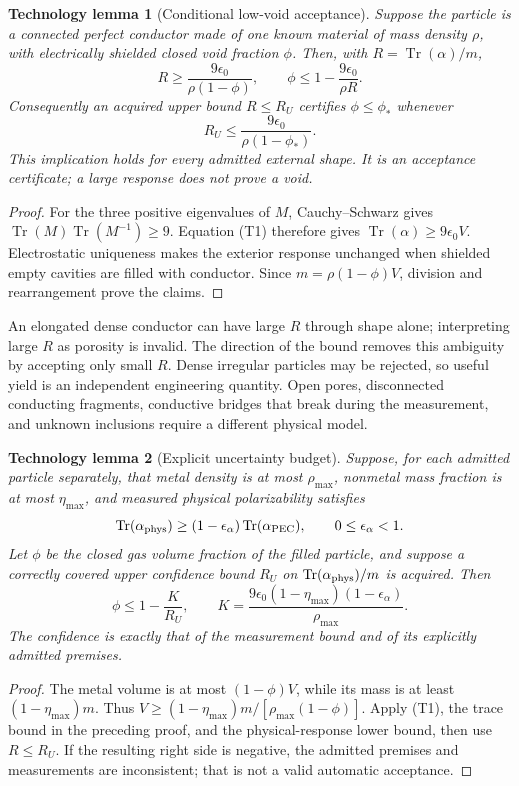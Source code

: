 \documentclass[11pt]{article}
\newcommand{\Tr}{\operatorname{Tr}}
\newtheorem{techtheorem}{Technology lemma}
\begin{document}
\begin{techtheorem}[Conditional low-void acceptance]\label{thm:void}
Suppose the particle is a connected perfect conductor made of one known material of mass density $\rho$, with electrically shielded closed void fraction $\phi$. Then, with $R=\Tr(\alpha)/m$,
\[
 R\ge\frac{9\epsilon_0}{\rho(1-\phi)},\qquad
 \phi\le 1-\frac{9\epsilon_0}{\rho R}.
 \tag{T2}
\]
Consequently an acquired upper bound $R\le R_U$ certifies $\phi\le\phi_*$ whenever
\[
 R_U\le\frac{9\epsilon_0}{\rho(1-\phi_*)}.
 \tag{T3}
\]
This implication holds for every admitted external shape. It is an acceptance certificate; a large response does not prove a void.
\end{techtheorem}
\begin{proof}
For the three positive eigenvalues of $M$, Cauchy--Schwarz gives
$\Tr(M)\Tr(M^{-1})\ge9$. Equation (T1) therefore gives $\Tr(\alpha)\ge9\epsilon_0 V$. Electrostatic uniqueness makes the exterior response unchanged when shielded empty cavities are filled with conductor. Since $m=\rho(1-\phi)V$, division and rearrangement prove the claims.
\end{proof}

An elongated dense conductor can have large $R$ through shape alone; interpreting large $R$ as porosity is invalid. The direction of the bound removes this ambiguity by accepting only small $R$. Dense irregular particles may be rejected, so useful yield is an independent engineering quantity. Open pores, disconnected conducting fragments, conductive bridges that break during the measurement, and unknown inclusions require a different physical model.

\begin{techtheorem}[Explicit uncertainty budget]\label{thm:voidrobust}
Suppose, for each admitted particle separately, that metal density is at most $\rho_{\max}$, nonmetal mass fraction is at most $\eta_{\max}$, and measured physical polarizability satisfies
\[
 \Tr(\alpha_{\rm phys})\ge(1-\epsilon_\alpha)
       \Tr(\alpha_{\rm PEC}),\qquad 0\le\epsilon_\alpha<1.
\]
Let $\phi$ be the closed gas volume fraction of the filled particle, and suppose a correctly covered upper confidence bound $R_U$ on $\Tr(\alpha_{\rm phys})/m$ is acquired. Then
\[
 \phi\le1-\frac{K}{R_U},\qquad
 K=\frac{9\epsilon_0(1-\eta_{\max})(1-\epsilon_\alpha)}{\rho_{\max}}.
 \tag{T4}
\]
The confidence is exactly that of the measurement bound and of its explicitly admitted premises.
\end{techtheorem}
\begin{proof}
The metal volume is at most $(1-\phi)V$, while its mass is at least $(1-\eta_{\max})m$. Thus
$V\ge(1-\eta_{\max})m/[\rho_{\max}(1-\phi)]$.
Apply (T1), the trace bound in the preceding proof, and the physical-response lower bound, then use $R\le R_U$. If the resulting right side is negative, the admitted premises and measurements are inconsistent; that is not a valid automatic acceptance.
\end{proof}
\end{document}
